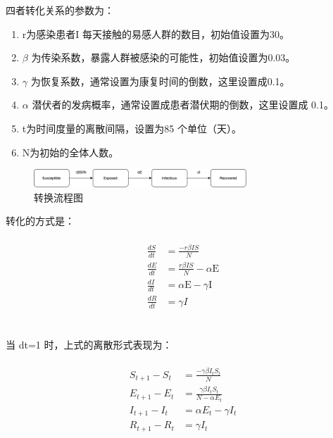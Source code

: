 \documentclass[UTF8]{ctexart}
\begin{document}
\par 四者转化关系的参数为：
\begin{enumerate}
    \item   r为感染患者I 每天接触的易感人群的数目，初始值设置为30。
    \item 	$\beta$ 为传染系数，暴露人群被感染的可能性，初始值设置为0.03。
    \item 	$\gamma$ 为恢复系数，通常设置为康复时间的倒数，这里设置成0.1。 
    \item 	$\alpha$ 潜伏者的发病概率，通常设置成患者潜伏期的倒数，这里设置成 0.1。
    \item   t为时间度量的离散间隔，设置为85 个单位（天）。
    \item   N为初始的全体人数。
\end{enumerate}

\begin{figure}[htbp][H]
\centering
\includegraphics[width=8cm]{liu.png} 
\caption{转换流程图}
\end{figure}
\par

转化的方式是：
\\\hspace*{\fill}\\
$$
\begin{aligned}
\frac{d S}{d t}&=\frac{-r \beta I S}{N} \\
\frac{d E}{d t}&=\frac{r \beta I S}{N}-\alpha \mathrm{E} \\
\frac{d I}{d t}&=\alpha \mathrm{E}-\gamma \mathrm{I} \\
\frac{d R}{d t}&=\gamma I
\end{aligned}
$$
\\\hspace*{\fill}\\
当 dt=1 时，上式的离散形式表现为：
\\\hspace*{\fill}\\
$$
\begin{aligned}
S_{t+1}-S_{t}&=\frac{-\gamma \beta I_{t} S_{t}}{N} \\
E_{t+1}-E_{t}&=\frac{\gamma \beta I_{t} S_{t}}{N-\alpha E_{t}} \\
I_{t+1}-I_{t}&=\alpha E_{t}-\gamma I_{t} \\
R_{t+1}-R_{t}&=\gamma I_{t}
\end{aligned}
$$
\end{document}
